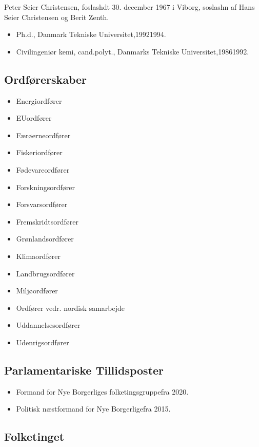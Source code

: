 \documentclass[11pt, a4paper]{awesome-cv}
\begin{document}
\makecvheader[R]
\makelettertitle
\begin{cvletter}
Peter Seier Christensen, foslashdt 30. december 1967 i Viborg, soslashn af Hans Seier Christensen og Berit Zenth.

\begin{itemize}
\item Ph.d., Danmark Tekniske Universitet,19921994.
\item Civilingeniør kemi, cand.polyt., Danmarks Tekniske Universitet,19861992.
\end{itemize}
\subsection*{Ordførerskaber}
\begin{itemize}
\item Energiordfører
\item EUordfører
\item Færøerneordfører
\item Fiskeriordfører
\item Fødevareordfører
\item Forskningsordfører
\item Forsvarsordfører
\item Fremskridtsordfører
\item Grønlandsordfører
\item Klimaordfører
\item Landbrugsordfører
\item Miljøordfører
\item Ordfører vedr. nordisk samarbejde
\item Uddannelsesordfører
\item Udenrigsordfører
\end{itemize}
\subsection*{Parlamentariske Tillidsposter}
\begin{itemize}
\item Formand for Nye Borgerliges folketingsgruppefra 2020.
\item Politisk næstformand for Nye Borgerligefra 2015.
\end{itemize}
\subsection*{Folketinget}

\end{cvletter}
\end{document}
